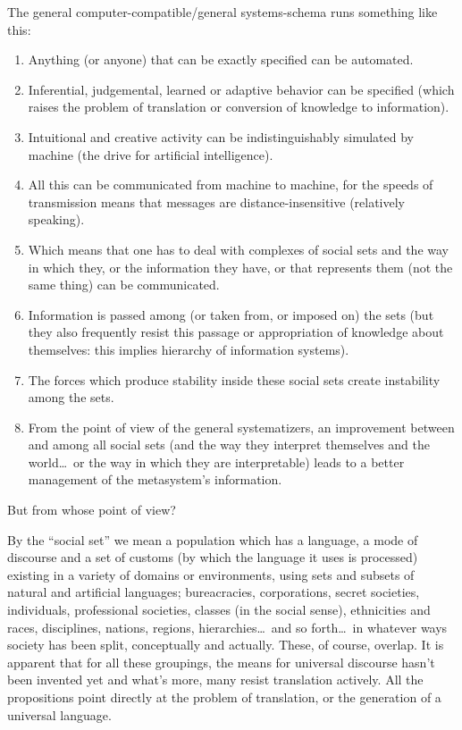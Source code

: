 The general computer-compatible\slash general systems-schema runs something like this:
\begin{enumerate}
	\item Anything (or anyone) that can be exactly specified can be automated.
	\item Inferential, judgemental, learned or adaptive behavior can be specified (which raises the problem of translation or conversion of knowledge to information).
	\item Intuitional and creative activity can be indistinguishably simulated by machine (the drive for artificial intelligence).
	\item All this can be communicated from machine to machine, for the speeds of transmission means that messages are distance-insensitive (relatively speaking).
	\item Which means that one has to deal with complexes of social sets and the way in which they, or the information they have, or that represents them (not the same thing) can be communicated.
	\item Information is passed among (or taken from, or imposed on) the sets (but they also frequently resist this passage or appropriation of knowledge about themselves: this implies hierarchy of information systems).
	\item The forces which produce stability inside these social sets create instability among the sets.
	\item From the point of view of the general systematizers, an improvement between and among all social sets (and the way they interpret themselves and the world\ldots\ or the way in which they are interpretable) leads to a better management of the metasystem's information.
\end{enumerate}

But from whose point of view?

By the \enquote{social set} we mean a population
which has a language, a mode of discourse
and a set of customs (by which the language
it uses is processed) existing in a variety of
domains or environments, using sets and
subsets of natural and artificial languages;
bureacracies, corporations, secret societies,
individuals, professional societies, classes
(in the social sense), ethnicities and races,
disciplines, nations, regions, hierarchies\ldots\ and so forth\ldots\ in whatever ways society has
been split, conceptually and actually. These,
of course, overlap. It is apparent that for all
these groupings, the means for universal
discourse hasn't been invented yet and
what's more, many resist translation actively.
All the propositions point directly at the
problem of translation, or the generation of a
universal language.

